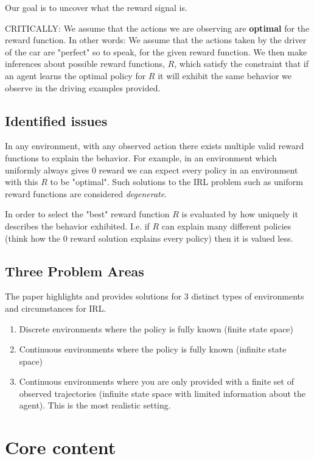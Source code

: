 \documentclass{article}
\begin{document}
    Our goal is to uncover what the reward signal is.


    CRITICALLY: We assume that the actions we are observing are \textbf{optimal} for the reward function. In other words: We assume that the actions taken by the driver of the car are "perfect" so to speak, for the given reward function. 
    We then make inferences about possible reward functions, $R$, which satisfy the constraint that if an agent learns the optimal policy for $R$ it will exhibit the same behavior we observe in the driving examples provided. 


    \subsection{Identified issues}
    In any environment, with any observed action there exists multiple valid reward functions to explain the behavior. For example, in an environment which uniformly always gives 0 reward we can expect every policy in an environment with this $R$ to be "optimal". Such solutions to the IRL problem such as uniform reward functions are considered \emph{degenerate}.
    
    In order to select the "best" reward function $R$ is evaluated by how uniquely it describes the behavior exhibited. I.e. if $R$ can explain many different policies (think how the 0 reward solution explains every policy) then it is valued less.


    \subsection{Three Problem Areas}
    The paper highlights and provides solutions for 3 distinct types of environments and circumstances for IRL.
    \begin{enumerate} 
        \item Discrete environments where the policy is fully known (finite state space)
        \item Continuous environments where the policy is fully known (infinite state space)
        \item Continuous environments where you are only provided with a finite set of observed trajectories (infinite state space with limited information about the agent). This is the most realistic setting.
    \end{enumerate}

    \section{Core content}
    
\end{document}
